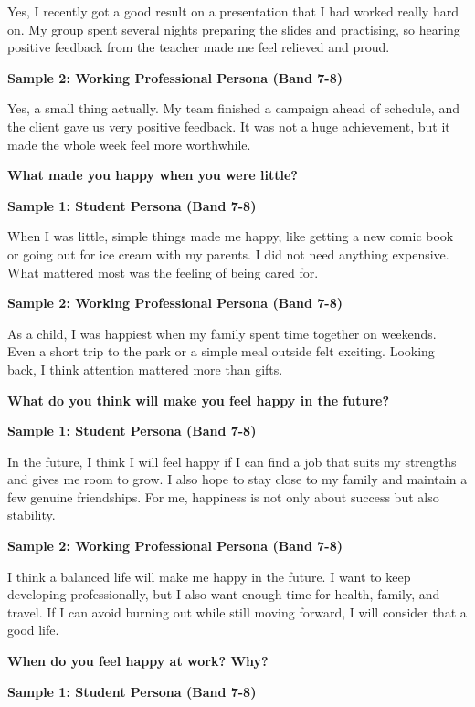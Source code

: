 Yes, I recently got a good result on a presentation that I had worked really hard on. My group spent several nights preparing the slides and practising, so hearing positive feedback from the teacher made me feel relieved and proud.

\textbf{Sample 2: Working Professional Persona (Band 7-8)}

Yes, a small thing actually. My team finished a campaign ahead of schedule, and the client gave us very positive feedback. It was not a huge achievement, but it made the whole week feel more worthwhile.

\separator

\begin{ieltsquestion}
\textbf{What made you happy when you were little?}
\end{ieltsquestion}
\textbf{Sample 1: Student Persona (Band 7-8)}

When I was little, simple things made me happy, like getting a new comic book or going out for ice cream with my parents. I did not need anything expensive. What mattered most was the feeling of being cared for.

\textbf{Sample 2: Working Professional Persona (Band 7-8)}

As a child, I was happiest when my family spent time together on weekends. Even a short trip to the park or a simple meal outside felt exciting. Looking back, I think attention mattered more than gifts.

\separator

\begin{ieltsquestion}
\textbf{What do you think will make you feel happy in the future?}
\end{ieltsquestion}
\textbf{Sample 1: Student Persona (Band 7-8)}

In the future, I think I will feel happy if I can find a job that suits my strengths and gives me room to grow. I also hope to stay close to my family and maintain a few genuine friendships. For me, happiness is not only about success but also stability.

\textbf{Sample 2: Working Professional Persona (Band 7-8)}

I think a balanced life will make me happy in the future. I want to keep developing professionally, but I also want enough time for health, family, and travel. If I can avoid burning out while still moving forward, I will consider that a good life.

\separator

\begin{ieltsquestion}
\textbf{When do you feel happy at work? Why?}
\end{ieltsquestion}
\textbf{Sample 1: Student Persona (Band 7-8)}

